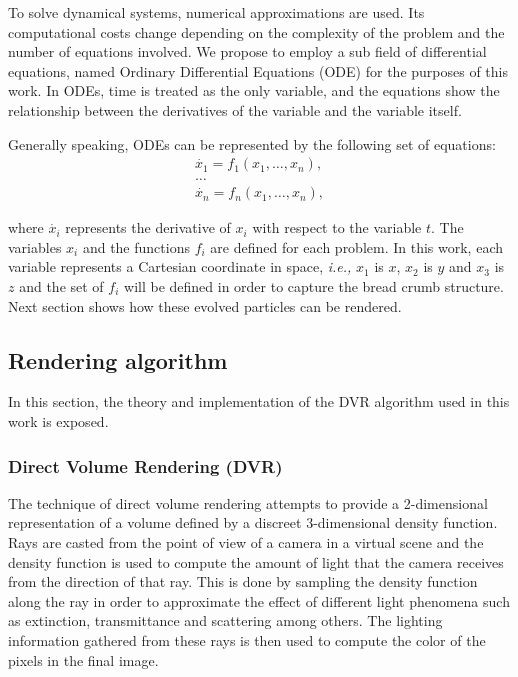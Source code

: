 \documentclass[oneside,a4paper,english,links]{amca}
\begin{document}
To solve dynamical systems, numerical approximations are used. Its computational costs change depending on the complexity of the problem and the number of equations involved. We propose to employ a sub field of differential equations, named Ordinary Differential Equations (ODE) for the purposes of this work. In ODEs, time is treated as the only variable, and the equations show the relationship between the derivatives of the variable and the variable itself. 

Generally speaking, ODEs can be represented by the following set of equations:
\begin{equation} \label{eq:simple}  
  \begin{aligned}
    \dot{x_{1}} = f_{1}(x_{1},\ldots,x_{n}),\\
    \ldots\\
    \dot{x_{n}} = f_{n}(x_{1},\ldots,x_{n}),
  \end{aligned}
\end{equation}

where $\dot{x_{i}}$ represents the derivative of $x_{i}$ with respect to the variable $t$. The variables $x_{i}$ and the functions $f_{i}$ are defined for each problem. In this work, each variable represents a Cartesian coordinate in space, {\em i.e.,} $x_{1}$ is $x$, $x_{2}$ is $y$ and $x_{3}$ is $z$ and the set of $f_{i}$ will be defined in order to capture the bread crumb structure. Next section shows how these evolved particles can be rendered.


\subsection{Rendering algorithm}

In this section, the theory and implementation of the DVR algorithm used in this work is exposed.

\subsubsection{Direct Volume Rendering (DVR)}

The technique of direct volume rendering attempts to provide a
2-dimensional representation of a volume defined by a discreet
3-dimensional density function. Rays are casted from the point of view
of a camera in a virtual scene and the density function is used to
compute the amount of light that the camera receives from the
direction of that ray. This is done by sampling the density function
along the ray in order to approximate the effect of different light
phenomena such as extinction, transmittance and scattering among
others. The lighting information gathered from these rays is then
used to compute the color of the pixels in the final image.
\end{document}
